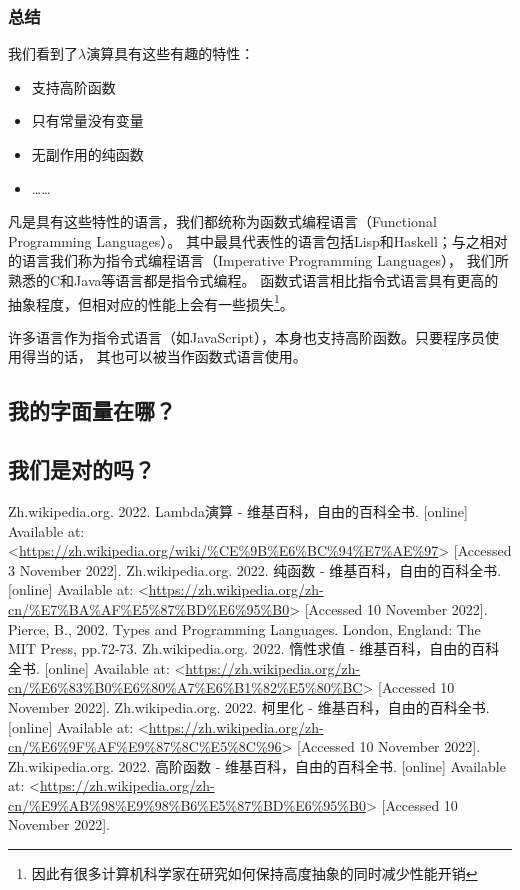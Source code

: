 \documentclass[../main.tex]{subfiles}
\begin{document}
    \subsubsection*{总结}
      \indent 我们看到了$\lambda$演算具有这些有趣的特性：

      \begin{itemize}
        \item 支持高阶函数
        \item 只有常量没有变量
        \item 无副作用的纯函数
        \item ……
      \end{itemize}

      \indent 凡是具有这些特性的语言，我们都统称为函数式编程语言（Functional Programming Languages）。
      其中最具代表性的语言包括Lisp和Haskell；与之相对的语言我们称为指令式编程语言（Imperative Programming Languages），
      我们所熟悉的C和Java等语言都是指令式编程。
      函数式语言相比指令式语言具有更高的抽象程度，但相对应的性能上会有一些损失\footnote[1]{因此有很多计算机科学家在研究如何保持高度抽象的同时减少性能开销}。
      
      \indent 许多语言作为指令式语言（如JavaScript），本身也支持高阶函数。只要程序员使用得当的话，
      其也可以被当作函数式语言使用。

  \subsection{我的字面量在哪？}

  \subsection{我们是对的吗？}

  \begin{thebibliography}{6}
     Zh.wikipedia.org. 2022. Lambda演算 - 维基百科，自由的百科全书. [online] Available at: <\url{https://zh.wikipedia.org/wiki/%CE%9B%E6%BC%94%E7%AE%97}> [Accessed 3 November 2022]. 
     Zh.wikipedia.org. 2022. 纯函数 - 维基百科，自由的百科全书. [online] Available at: <\url{https://zh.wikipedia.org/zh-cn/%E7%BA%AF%E5%87%BD%E6%95%B0}> [Accessed 10 November 2022]. 
     Pierce, B., 2002. Types and Programming Languages. London, England: The MIT Press, pp.72-73.
     Zh.wikipedia.org. 2022. 惰性求值 - 维基百科，自由的百科全书. [online] Available at: <\url{https://zh.wikipedia.org/zh-cn/%E6%83%B0%E6%80%A7%E6%B1%82%E5%80%BC}> [Accessed 10 November 2022]. 
     Zh.wikipedia.org. 2022. 柯里化 - 维基百科，自由的百科全书. [online] Available at: <\url{https://zh.wikipedia.org/zh-cn/%E6%9F%AF%E9%87%8C%E5%8C%96}> [Accessed 10 November 2022]. 
     Zh.wikipedia.org. 2022. 高阶函数 - 维基百科，自由的百科全书. [online] Available at: <\url{https://zh.wikipedia.org/zh-cn/%E9%AB%98%E9%98%B6%E5%87%BD%E6%95%B0}> [Accessed 10 November 2022]. 
  \end{thebibliography}
\end{document}
